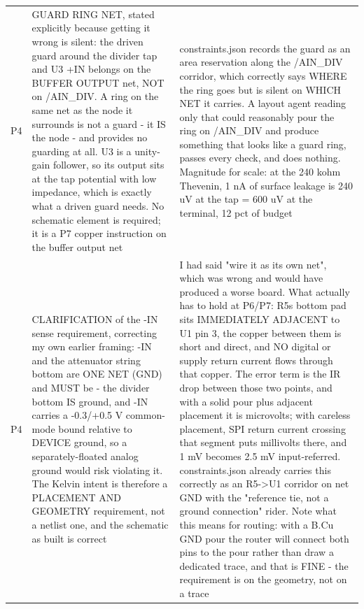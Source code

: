 \documentclass[11pt,a4paper]{article}
\begin{document}
{\begin{longtable}{lp{5.2cm}p{7.2cm}}
P4 & GUARD RING NET, stated explicitly because getting it wrong is silent: the driven guard around the divider tap and U3 +IN belongs on the BUFFER OUTPUT net, NOT on /AIN\_DIV. A ring on the same net as the node it surrounds is not a guard - it IS the node - and provides no guarding at all. U3 is a unity-gain follower, so its output sits at the tap potential with low impedance, which is exactly what a driven guard needs. No schematic element is required; it is a P7 copper instruction on the buffer output net & constraints.json records the guard as an area reservation along the /AIN\_DIV corridor, which correctly says WHERE the ring goes but is silent on WHICH NET it carries. A layout agent reading only that could reasonably pour the ring on /AIN\_DIV and produce something that looks like a guard ring, passes every check, and does nothing. Magnitude for scale: at the 240 kohm Thevenin, 1 nA of surface leakage is 240 uV at the tap = 600 uV at the terminal, 12 pct of budget \\
P4 & CLARIFICATION of the -IN sense requirement, correcting my own earlier framing: -IN and the attenuator string bottom are ONE NET (GND) and MUST be - the divider bottom IS ground, and -IN carries a -0.3/+0.5 V common-mode bound relative to DEVICE ground, so a separately-floated analog ground would risk violating it. The Kelvin intent is therefore a PLACEMENT AND GEOMETRY requirement, not a netlist one, and the schematic as built is correct & I had said "wire it as its own net", which was wrong and would have produced a worse board. What actually has to hold at P6/P7: R5s bottom pad sits IMMEDIATELY ADJACENT to U1 pin 3, the copper between them is short and direct, and NO digital or supply return current flows through that copper. The error term is the IR drop between those two points, and with a solid pour plus adjacent placement it is microvolts; with careless placement, SPI return current crossing that segment puts millivolts there, and 1 mV becomes 2.5 mV input-referred. constraints.json already carries this correctly as an R5-\textgreater{}U1 corridor on net GND with the "reference tie, not a ground connection" rider. Note what this means for routing: with a B.Cu GND pour the router will connect both pins to the pour rather than draw a dedicated trace, and that is FINE - the requirement is on the geometry, not on a trace \\

\end{longtable}}
\end{document}
